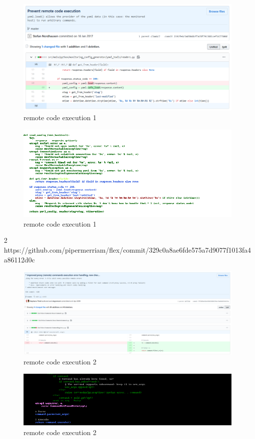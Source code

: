 \documentclass[
a4paper,
pagesize,
pdftex,
12pt,
twoside, %
BCOR=5mm, %
ngerman,
fleqn,
final,
]{scrartcl}
\begin{document}
\begin{figure}[h]
	\centering
	\includegraphics[width=\linewidth]{Images/remote_code_execution1}
	\caption{remote code execution 1}
	\label{fig:remote_code_execution1}
\end{figure}
\begin{figure}[h]
	\centering
	\includegraphics[width=\linewidth]{Images/remote_code_execution1r}
	\caption{remote code execution 1}
	\label{fig:remote_code_execution1r}
\end{figure}

2 https://github.com/pipermerriam/flex/commit/329c0a8ae6fde575a7d9077f1013fa4a86112d0c

\begin{figure}[h]
	\centering
	\includegraphics[width=\linewidth]{Images/remote_code_execution2}
	\caption{remote code execution 2}
	\label{fig:remote_code_execution2}
\end{figure}
\begin{figure}[h]
	\centering
	\includegraphics[width=\linewidth]{Images/remote_code_execution2r}
	\caption{remote code execution 2}
	\label{fig:remote_code_execution2r}
\end{figure}
\end{document}
